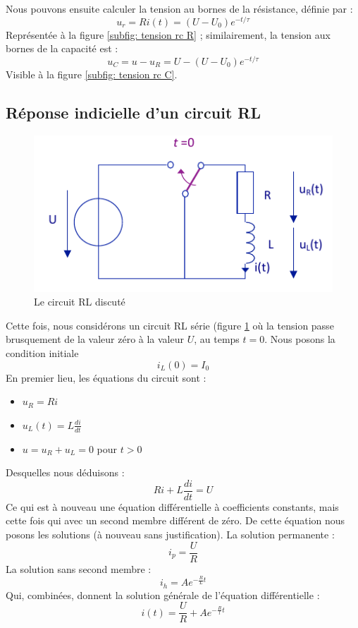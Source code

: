 \documentclass[12pt,a4paper]{article}
\begin{document}
Nous pouvons ensuite calculer la tension au bornes de la résistance, définie par :
\[u_r = Ri(t) = (U-U_0)e^{-t/\tau}\]
Représentée à la figure \ref{subfig: tension rc R} ; similairement, la tension aux bornes de la capacité est :
\[u_C = u - u_R = U-(U-U_0)e^{-t/\tau}\]
Visible à la figure \ref{subfig: tension rc C}.

\subsection[Circuit RL]{Réponse indicielle d'un circuit RL}
\begin{figure}
	\centering
	\includegraphics[scale=0.5]{images/circuit_rl_saut}
	\caption{Le circuit RL discuté}
	\label{fig: circuit rl}
\end{figure}
Cette fois, nous considérons un circuit RL série (figure \ref{fig: circuit rl} où la tension passe brusquement de la valeur zéro à la valeur $U$, au temps $t=0$. Nous posons la condition initiale 
\[i_L(0) = I_0\]
En premier lieu, les équations du circuit sont :
\begin{itemize}
	\item 	$u_R = Ri$
	\item 	$u_L(t) = L\frac{di}{dt}$
	\item 	$u = u_R + u_L = 0$ pour $t>0$
\end{itemize}
Desquelles nous déduisons :
\begin{equation}
	Ri + L\frac{di}{dt} = U
\end{equation}
Ce qui est à nouveau une équation différentielle à coefficients constants, mais cette fois qui avec un second membre différent de zéro. De cette équation nous posons les solutions (à nouveau sans justification). La solution permanente :
\[i_p = \frac{U}{R}\]
La solution sans second membre :
\[i_h = Ae^{-\frac{R}{L}t}\]
Qui, combinées, donnent la solution générale de l'équation différentielle :
\begin{equation}
	i(t) = \frac{U}{R} + Ae^{-\frac{R}{l}t}
\end{equation}
\end{document}
